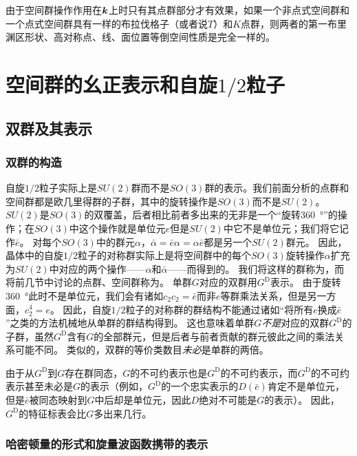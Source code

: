 由于空间群操作作用在$\vb*{k}$上时只有其点群部分才有效果，如果一个非点式空间群和一个点式空间群具有一样的布拉伐格子（或者说$T$）和$K$点群，则两者的第一布里渊区形状、高对称点、线、面位置等倒空间性质是完全一样的。

\section{空间群的幺正表示和自旋$1/2$粒子}

\subsection{双群及其表示}

\subsubsection{双群的构造}

自旋$1/2$粒子实际上是$SU(2)$群而不是$SO(3)$群的表示。我们前面分析的点群和空间群都是欧几里得群的子群，其中的旋转操作是$SO(3)$而不是$SU(2)$。
$SU(2)$是$SO(3)$的双覆盖，后者相比前者多出来的无非是一个“旋转\SI{360}{\degree}”的操作；在$SO(3)$中这个操作就是单位元$e$但是$SU(2)$中它不是单位元；我们将它记作$\bar{e}$。
对每个$SO(3)$中的群元$\alpha$，$\bar{\alpha} = \bar{e} \alpha = \alpha \bar{e}$都是另一个$SU(2)$群元。
因此，晶体中的自旋$1/2$粒子的对称群实际上是将空间群中的每个$SO(3)$旋转操作$\alpha$扩充为$SU(2)$中对应的两个操作——$\alpha$和$\bar{\alpha}$——而得到的。
我们将这样的群称为，而将前几节中讨论的点群、空间群称为。
单群$G$对应的双群用$G^\text{D}$表示。
由于旋转\SI{360}{\degree}此时不是单位元，我们会有诸如$c_2 c_2 = \bar{e}$而非$e$等群乘法关系，但是另一方面，$c_2^4 = e$。
因此，自旋$1/2$粒子的对称群的群结构不能通过诸如“将所有$e$换成$\bar{e}$”之类的方法机械地从单群的群结构得到。
这也意味着单群$G$\emph{不是}对应的双群$G^\text{D}$的子群，虽然$G^\text{D}$含有$G$的全部群元，但是后者与前者贡献的群元彼此之间的乘法关系可能不同。
类似的，双群的等价类数目\emph{未必}是单群的两倍。

由于从$G^\text{D}$到$G$存在群同态，$G$的不可约表示也是$G^\text{D}$的不可约表示，而$G^\text{D}$的不可约表示甚至未必是$G$的表示（例如，$G^\text{D}$的一个忠实表示的$D(\bar{e})$肯定不是单位元，但是$\bar{e}$被同态映射到$G$中后却是单位元，因此$D$绝对不可能是$G$的表示）。
因此，$G^\text{D}$的特征标表会比$G$多出来几行。

\subsubsection{哈密顿量的形式和旋量波函数携带的表示}

